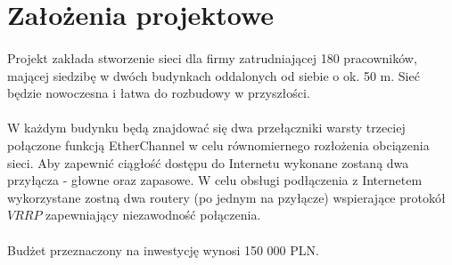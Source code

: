 \section{Założenia projektowe}
\paragraph{}
Projekt zakłada stworzenie sieci dla firmy zatrudniającej 180 pracowników, mającej siedzibę w dwóch budynkach oddalonych od siebie o ok. 50 m. Sieć będzie nowoczesna i łatwa do rozbudowy w przyszłości.

\paragraph{}
W każdym budynku będą znajdować się dwa przełączniki warsty trzeciej połączone funkcją EtherChannel w celu równomiernego rozłożenia obciązenia sieci. Aby zapewnić ciągłość dostępu do Internetu wykonane zostaną dwa przyłącza - głowne oraz zapasowe. W celu obsługi podłączenia z Internetem wykorzystane zostną dwa routery (po jednym na pzyłącze) wspierające protokół $VRRP$ zapewniający niezawodność połączenia.

\paragraph{}
Budżet przeznaczony na inwestycję wynosi 150 000 PLN.

